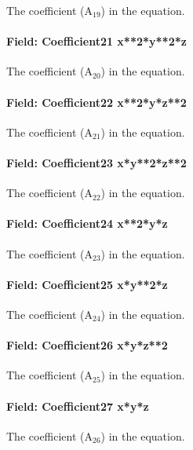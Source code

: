 The coefficient (A\(_{19}\)) in the equation.

\paragraph{Field: Coefficient21 x**2*y**2*z}\label{field-coefficient21-x2y2z}

The coefficient (A\(_{20}\)) in the equation.

\paragraph{Field: Coefficient22 x**2*y*z**2}\label{field-coefficient22-x2yz2}

The coefficient (A\(_{21}\)) in the equation.

\paragraph{Field: Coefficient23 x*y**2*z**2}\label{field-coefficient23-xy2z2}

The coefficient (A\(_{22}\)) in the equation.

\paragraph{Field: Coefficient24 x**2*y*z}\label{field-coefficient24-x2yz}

The coefficient (A\(_{23}\)) in the equation.

\paragraph{Field: Coefficient25 x*y**2*z}\label{field-coefficient25-xy2z}

The coefficient (A\(_{24}\)) in the equation.

\paragraph{Field: Coefficient26 x*y*z**2}\label{field-coefficient26-xyz2}

The coefficient (A\(_{25}\)) in the equation.

\paragraph{Field: Coefficient27 x*y*z}\label{field-coefficient27-xyz}

The coefficient (A\(_{26}\)) in the equation.

